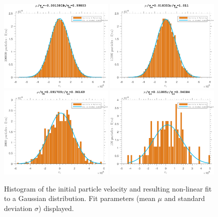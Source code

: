 \begin{figure}[h!]
  \centering
    \includegraphics[width=0.49\textwidth]{../Results/Distribution_unifB_E0_100000particles.pdf}
    \includegraphics[width=0.49\textwidth]{../Results/Distribution_unifB_E0_10000particles.pdf}
    \includegraphics[width=0.49\textwidth]{../Results/Distribution_unifB_E0_1000particles.pdf}
    \includegraphics[width=0.49\textwidth]{../Results/Distribution_unifB_E0_100particles.pdf}
    \label{dist}
  \caption{Histogram of the initial particle velocity and resulting non-linear fit to a Gaussian distribution. Fit parameters (mean $\mu$ and standard deviation $\sigma$) displayed.}
\end{figure}

